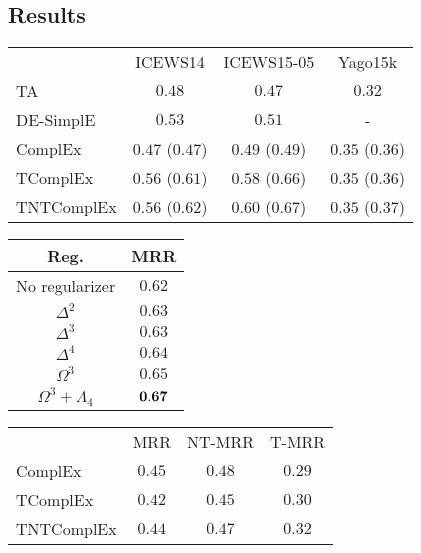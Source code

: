\documentclass{article}
\begin{document}
\subsection{Results}


\begin{table*}[t]
\begin{minipage}{0.7\linewidth}
\centering
\begin{tabular}{lccc}
\toprule
{} &  ICEWS14 & ICEWS15-05 & Yago15k\\
TA & $0.48$ & $0.47$ & $0.32$ \\
DE-SimplE & $0.53$ & $0.51$ & - \\
ComplEx & $0.47$ ($0.47$) & $0.49$ ($0.49$) & $\mathbf{0.35}$ ($0.36$) \\
\midrule
TComplEx & $\mathbf{0.56}$ ($0.61$)& $0.58$ ($0.66$)& $\mathbf{0.35}$ ($0.36$) \\
TNTComplEx & $\mathbf{0.56}$ ($\mathbf{0.62}$)& $\mathbf{0.60}$ ($\mathbf{0.67}$) & $\mathbf{0.35}$ ($\mathbf{0.37}$)\\
\bottomrule
\end{tabular}
\caption{Results for TA \citep{garcia2018learning} and DE-SimplE \citep{goel2019diachronic} are the best numbers reported in the respective papers. Our models have as many parameters as DE-SimplE. Numbers in parentheses are for ranks multiplied by $10$.\label{tab:res}}
\end{minipage}
\hfill
\begin{minipage}{0.25\linewidth}
\centering
\begin{tabular}{c|c}
\toprule
Reg. & MRR\\ \midrule
No regularizer &  $0.62$ \\
$\Delta^2$ & $0.63$ \\
$\Delta^3$ &  $0.63$ \\
$\Delta^4$ & $0.64$\\
$\Omega^3$ & $0.65$\\
$\Omega^3+\Lambda_4$ & $ {\bf 0.67}$\\
\bottomrule
\end{tabular}
\caption{Impact of regularizers on ICEWS05-15 for TNTComplEx.\label{tab:ablation}}
\end{minipage}
\end{table*}

\begin{table*}[b]
\centering
\begin{tabular}{lccc}
\toprule
{} &  MRR & NT-MRR & T-MRR \\
ComplEx & $\mathbf{0.45}$ & $\mathbf{0.48}$ & $0.29$\\
\midrule
TComplEx & $0.42$ & $0.45$ & $0.30$ \\
TNTComplEx & $0.44$ & $0.47$ & $\mathbf{0.32}$ \\
\bottomrule
\end{tabular}
\caption{Results on wikidata for entity dimension $d=100$.}
\label{tab:res_wikidata}
\end{table*}
\end{document}
